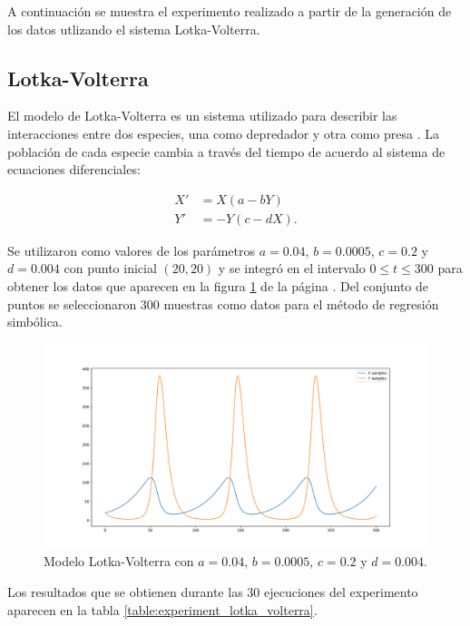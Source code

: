 A continuación se muestra el experimento realizado a partir de la generación de los datos utlizando el sistema Lotka-Volterra.

\subsection{Lotka-Volterra}

El modelo de Lotka-Volterra es un sistema utilizado para describir las interacciones entre dos especies, una como depredador y otra como presa \cite{Hoppensteadt:2006}. La población de cada especie cambia a través del tiempo de acuerdo al sistema de ecuaciones diferenciales:

\begin{align*}
    X' & = X (a - b Y)   \\
    Y' & = -Y (c - d X).
\end{align*}

Se utilizaron como valores de los parámetros $a = 0.04$, $b = 0.0005$, $c = 0.2$ y $d = 0.004$ con punto inicial $(20, 20)$ y se integró en el intervalo $0 \leq t \leq 300$ para obtener los datos que aparecen en la figura \ref{fig:lotka_volterra} de la página \pageref{fig:lotka_volterra}. Del conjunto de puntos se seleccionaron 300 muestras como datos para el método de regresión simbólica.

\begin{figure}[h]
    \centering
    \includegraphics[width=\textwidth]{"figures/lotka_volterra.pdf"}
    \caption{Modelo Lotka-Volterra con $a = 0.04$, $b = 0.0005$, $c = 0.2$ y $d = 0.004$.}
    \label{fig:lotka_volterra}
\end{figure}

Los resultados que se obtienen durante las 30 ejecuciones del experimento aparecen en la tabla \ref{table:experiment_lotka_volterra}.

